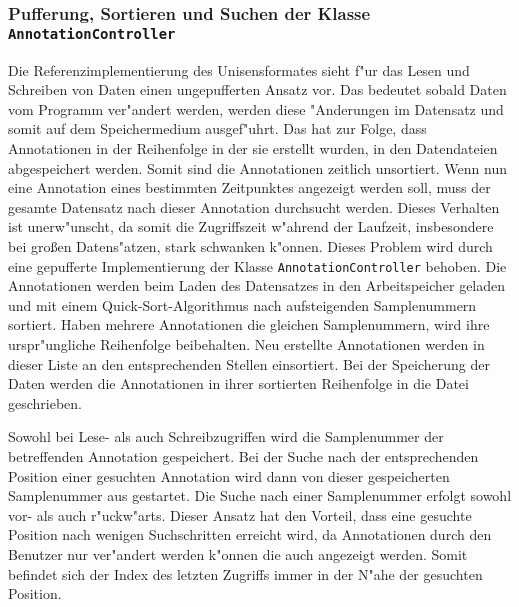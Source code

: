 
\subsubsection{Pufferung, Sortieren und Suchen der Klasse \texttt{Annotation\-Con\-trol\-ler}}
\label{sec:anno_ctrl}

Die Referenzimplementierung des Unisensformates sieht f"ur das Lesen und Schreiben von Daten einen ungepufferten Ansatz vor.
Das bedeutet sobald Daten vom Programm ver"andert werden, werden diese "Anderungen im Datensatz und somit auf dem Speichermedium ausgef"uhrt.
Das hat zur Folge, dass Annotationen in der Reihenfolge in der sie erstellt wurden, in den Datendateien abgespeichert werden.
Somit sind die Annotationen zeitlich unsortiert.
Wenn nun eine Annotation eines bestimmten Zeitpunktes angezeigt werden soll, muss der gesamte Datensatz nach dieser Annotation durchsucht werden.
Dieses Verhalten ist unerw"unscht, da somit die Zugriffszeit w"ahrend der Laufzeit, insbesondere bei gro\ss en Datens"atzen, stark schwanken k"onnen.
Dieses Problem wird durch eine gepufferte Implementierung der Klasse \verb|AnnotationController| behoben.
Die Annotationen werden beim Laden des Datensatzes in den Arbeitspeicher geladen und mit einem Quick-Sort-Algorithmus nach aufsteigenden Samplenummern sortiert.
Haben mehrere Annotationen die gleichen Samplenummern, wird ihre urspr"ungliche Reihenfolge beibehalten.
Neu erstellte Annotationen werden in dieser Liste an den entsprechenden Stellen einsortiert.
Bei der Speicherung der Daten werden die Annotationen in ihrer sortierten Reihenfolge in die Datei geschrieben.

Sowohl bei Lese- als auch Schreibzugriffen wird die Samplenummer der betreffenden Annotation gespeichert.
Bei der Suche nach der entsprechenden Position einer gesuchten Annotation wird dann von dieser gespeicherten Samplenummer aus gestartet.
Die Suche nach einer Samplenummer erfolgt sowohl vor- als auch r"uckw"arts.
Dieser Ansatz hat den Vorteil, dass eine gesuchte Position nach wenigen Suchschritten erreicht wird, da Annotationen durch den Benutzer nur ver"andert werden k"onnen die auch angezeigt werden.
Somit befindet sich der Index des letzten Zugriffs immer in der N"ahe der gesuchten Position.

